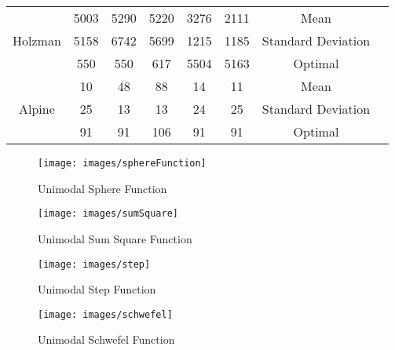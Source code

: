 \documentclass[conference]{IEEEtran}
\begin{document}
\begin{abstract1}
\begin{table}[htbp]
\begin{center}
\begin{tabular}{cccccccc|}
	      \hline
	     \multirow{3}{*}{Holzman} & 5003 & 5290 & 5220 & 3276 & 2111 & Mean \\
	     & 5158 & 6742 & 5699 & 1215 & 1185 & Standard Deviation \\
	     & 550 & 550 & 617 & 5504 & 5163& Optimal	\\	
	     
	      \hline
	     \multirow{3}{*}{Alpine} & 10 & 48 & 88 & 14 & 11 & Mean \\
	     & 25 & 13 & 13 & 24 & 25 & Standard Deviation \\
	     & 91 & 91 & 106 & 91 & 91 & Optimal	\\						
	     \hline      				
	\end{tabular}


							
	
	
	
	
	
	\end{center}

\end{table}


\begin{figure}[htbp]
	\centerline{\texttt{[image: images/sphereFunction]}}
	\caption{Unimodal Sphere Function}
	\label{graphSphere}
\end{figure}

\begin{figure}[htbp]
	\centerline{\texttt{[image: images/sumSquare]}}
	\caption{Unimodal Sum Square Function}
	\label{graphSumSquare}
\end{figure}

\begin{figure}[htbp]
	\centerline{\texttt{[image: images/step]}}
	\caption{Unimodal Step Function}
	\label{graphStep}
\end{figure}


\begin{figure}[htbp]
	\centerline{\texttt{[image: images/schwefel]}}
	\caption{Unimodal Schwefel Function}
	\label{graphSchwefel}
\end{figure}


\end{abstract1}
\end{document}
